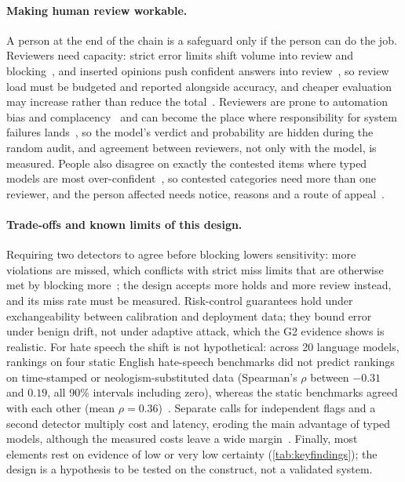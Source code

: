\paragraph{Making human review workable.}
A person at the end of the chain is a safeguard only if the person can do the job.
Reviewers need capacity: strict error limits shift volume into review and blocking~\cite{arx33401}, and inserted opinions push confident answers into review~\cite{arx31142}, so review load must be budgeted and reported alongside accuracy, and cheaper evaluation may increase rather than reduce the total~\cite{arx01231}.
Reviewers are prone to automation bias and complacency~\cite{parasuraman2010complacency,green2022flaws} and can become the place where responsibility for system failures lands~\cite{elish2019moral}, so the model's verdict and probability are hidden during the random audit, and agreement between reviewers, not only with the model, is measured.
People also disagree on exactly the contested items where typed models are most over-confident~\cite{pavlick2019inherent,davani2022dealing,zen23032384}\zmark{}, so contested categories need more than one reviewer, and the person affected needs notice, reasons and a route of appeal~\cite{santaclara2021,dsa2022}.

\paragraph{Trade-offs and known limits of this design.}
Requiring two detectors to agree before blocking lowers sensitivity: more violations are missed, which conflicts with strict miss limits that are otherwise met by blocking more~\cite{arx33401}; the design accepts more holds and more review instead, and its miss rate must be measured.
Risk-control guarantees hold under exchangeability between calibration and deployment data; they bound error under benign drift, not under adaptive attack, which the G2 evidence shows is realistic.
For hate speech the shift is not hypothetical: across 20 language models, rankings on four static English hate-speech benchmarks did not predict rankings on time-stamped or neologism-substituted data (Spearman's $\rho$ between $-0.31$ and $0.19$, all 90\% intervals including zero), whereas the static benchmarks agreed with each other (mean $\rho = 0.36$)~\cite{dibonaventura2025hatevolution}.
Separate calls for independent flags and a second detector multiply cost and latency, eroding the main advantage of typed models, although the measured costs leave a wide margin~\cite{arx00346,arx01079}.
Finally, most elements rest on evidence of low or very low certainty (\cref{tab:keyfindings}); the design is a hypothesis to be tested on the \pol{} construct, not a validated system.

